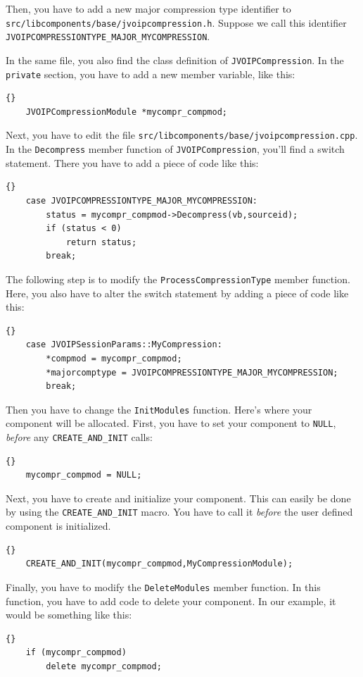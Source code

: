 		Then, you have to add a new major compression type identifier to 
		{\tt src/\-lib\-com\-po\-nents/\-base/\-jvoip\-com\-pres\-sion.h}. Suppose we call this 
		identifier {\tt JVOIP\-COM\-PRES\-SION\-TYPE\_MAJOR\_MY\-COM\-PRES\-SION}.
		
		In the same file, you also find the class definition of {\tt JVOIPCompression}.
		In the {\tt private} section, you have to add a new member variable, like this:
		\begin{lstlisting}[frame=tb]{}
	JVOIPCompressionModule *mycompr_compmod;
		\end{lstlisting}

		Next, you have to edit the file {\tt src/libcomponents/base/jvoipcompression.cpp}.
		In the {\tt Decompress} member function of {\tt JVOIPCompression}, you'll find a
		switch statement. There you have to add a piece of code like this:
		\begin{lstlisting}[frame=tb]{}
	case JVOIPCOMPRESSIONTYPE_MAJOR_MYCOMPRESSION:
		status = mycompr_compmod->Decompress(vb,sourceid);
		if (status < 0)
			return status;
		break;
		\end{lstlisting}

		The following step is to modify the {\tt ProcessCompressionType} member function.
		Here, you also have to alter the switch statement by adding a piece of code
		like this:
		\begin{lstlisting}[frame=tb]{}
	case JVOIPSessionParams::MyCompression:
		*compmod = mycompr_compmod;
		*majorcomptype = JVOIPCOMPRESSIONTYPE_MAJOR_MYCOMPRESSION;
		break;
		\end{lstlisting}

		Then you have to change the {\tt InitModules} function. Here's where your
		component will be allocated. First, you have to set your component to {\tt NULL},
		{\em before} any {\tt CREATE\_AND\_INIT} calls:
		\begin{lstlisting}[frame=tb]{}
	mycompr_compmod = NULL;
		\end{lstlisting}

		Next, you have to create and initialize your component. This can easily be done
		by using the {\tt CREATE\_AND\_INIT} macro. You have to call it {\em before} the
		user defined component is initialized.
		\begin{lstlisting}[frame=tb]{}
	CREATE_AND_INIT(mycompr_compmod,MyCompressionModule);
		\end{lstlisting}

		Finally, you have to modify the {\tt DeleteModules} member function. In this function,
		you have to add code to delete your component. In our example, it would be something
		like this:
		\begin{lstlisting}[frame=tb]{}
	if (mycompr_compmod)
		delete mycompr_compmod;
		\end{lstlisting}

